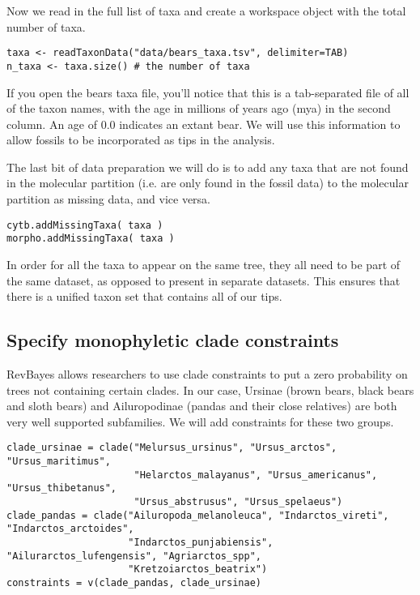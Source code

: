 Now we read in the full list of taxa and create a workspace object with the total number of taxa. 

{\tt \begin{snugshade*}
\begin{lstlisting}
taxa <- readTaxonData("data/bears_taxa.tsv", delimiter=TAB)
n_taxa <- taxa.size() # the number of taxa
\end{lstlisting}
\end{snugshade*}}

If you open the bears taxa file, you'll notice that this is a tab-separated file of all of the taxon names, with the age in millions of years ago (mya) in the second column. An age of 0.0 indicates an extant bear. We will use this information to allow fossils to be incorporated as tips in the analysis. \par

The last bit of data preparation we will do is to add any taxa that are not found in the molecular partition (i.e. are only found in the fossil data) to the molecular partition as missing data, and vice versa.

{\tt \begin{snugshade*}
\begin{lstlisting}
cytb.addMissingTaxa( taxa )
morpho.addMissingTaxa( taxa )
\end{lstlisting}
\end{snugshade*}}

In order for all the taxa to appear on the same tree, they all need to be part of the same dataset, as opposed to present in separate datasets. This ensures that there is a unified taxon set that contains all of our tips.

\bigskip

\subsection{Specify monophyletic clade constraints}

RevBayes allows researchers to use clade constraints to put a zero probability on trees not containing certain clades. In our case, Ursinae (brown bears, black bears and sloth bears) and Ailuropodinae (pandas and their close relatives) are both very well supported subfamilies. We will add constraints for these two groups.

{\tt \begin{snugshade*}
\begin{lstlisting}
clade_ursinae = clade("Melursus_ursinus", "Ursus_arctos", "Ursus_maritimus", 
                      "Helarctos_malayanus", "Ursus_americanus", "Ursus_thibetanus", 
                      "Ursus_abstrusus", "Ursus_spelaeus")
clade_pandas = clade("Ailuropoda_melanoleuca", "Indarctos_vireti", "Indarctos_arctoides", 
                     "Indarctos_punjabiensis", "Ailurarctos_lufengensis", "Agriarctos_spp", 
                     "Kretzoiarctos_beatrix")
constraints = v(clade_pandas, clade_ursinae)
\end{lstlisting}
\end{snugshade*}}


